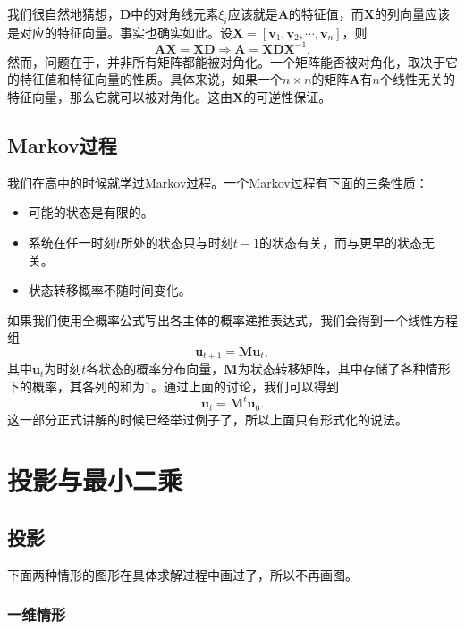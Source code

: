 \documentclass[a4paper, 12pt]{article}
\begin{document}
    我们很自然地猜想，$\boldsymbol D$中的对角线元素$\xi_i$应该就是$\boldsymbol A$的特征值，而$\boldsymbol X$的列向量应该是对应的特征向量。事实也确实如此。设$\boldsymbol X=[\boldsymbol v_1,\boldsymbol v_2,\cdots,\boldsymbol v_n]$，则
    \[
    \boldsymbol A\boldsymbol X = \boldsymbol X\boldsymbol D\Rightarrow \boldsymbol A=\boldsymbol X\boldsymbol D\boldsymbol X^{-1}.
    \]
    然而，问题在于，并非所有矩阵都能被对角化。一个矩阵能否被对角化，取决于它的特征值和特征向量的性质。具体来说，如果一个$n\times n$的矩阵$\boldsymbol A$有$n$个线性无关的特征向量，那么它就可以被对角化。这由$\boldsymbol X$的可逆性保证。

    \subsection{Markov过程}

    我们在高中的时候就学过Markov过程。一个Markov过程有下面的三条性质：
    \begin{itemize}
        \item 可能的状态是有限的。
        \item 系统在任一时刻$t$所处的状态只与时刻$t-1$的状态有关，而与更早的状态无关。
        \item 状态转移概率不随时间变化。
    \end{itemize}

    如果我们使用全概率公式写出各主体的概率递推表达式，我们会得到一个线性方程组
    \[
    \boldsymbol u_{t+1}=\boldsymbol M\boldsymbol u_t,
    \]
    其中$\boldsymbol u_t$为时刻$t$各状态的概率分布向量，$\boldsymbol M$为状态转移矩阵，其中存储了各种情形下的概率，其各列的和为1。通过上面的讨论，我们可以得到
    \[
    \boldsymbol u_{t}=\boldsymbol M^{t}\boldsymbol u_0.
    \]
    这一部分正式讲解的时候已经举过例子了，所以上面只有形式化的说法。

    \section{投影与最小二乘}

    \subsection{投影}
    
    下面两种情形的图形在具体求解过程中画过了，所以不再画图。

    \subsubsection{一维情形}
\end{document}

